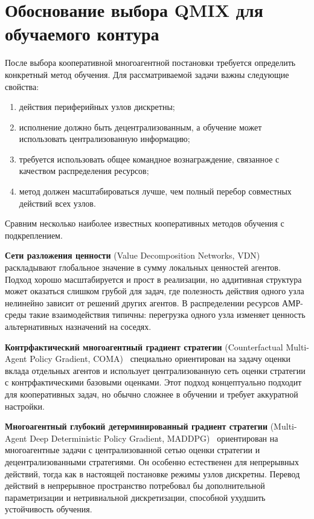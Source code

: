 \section{Обоснование выбора QMIX для обучаемого контура}

После выбора кооперативной многоагентной постановки требуется определить
конкретный метод обучения. Для рассматриваемой задачи важны следующие
свойства:
\begin{enumerate}
	\item действия периферийных узлов дискретны;
	\item исполнение должно быть децентрализованным, а обучение может использовать централизованную информацию;
	\item требуется использовать общее командное вознаграждение, связанное с
	качеством распределения ресурсов;
	\item метод должен масштабироваться лучше, чем полный перебор совместных
	действий всех узлов.
\end{enumerate}

Сравним несколько наиболее известных кооперативных методов обучения с подкреплением.

\textbf{Сети разложения ценности} (Value Decomposition Networks, VDN)~\cite{Sunehag2017VDN} раскладывают глобальное значение в сумму локальных ценностей агентов. Подход хорошо масштабируется и прост в реализации, но аддитивная структура может оказаться слишком грубой для задач, где полезность действия одного узла нелинейно зависит от решений других агентов. В распределении ресурсов АМР-среды такие взаимодействия типичны: перегрузка одного узла изменяет ценность альтернативных назначений на соседях.

\textbf{Контрфактический многоагентный градиент стратегии} (Counterfactual Multi-Agent Policy Gradient, COMA)~\cite{Foerster2017COMA} специально ориентирован на задачу оценки вклада отдельных агентов и использует централизованную сеть оценки стратегии с контрфактическими базовыми оценками. Этот подход концептуально подходит для кооперативных задач, но обычно сложнее в обучении и требует аккуратной настройки.

\textbf{Многоагентный глубокий детерминированный градиент стратегии} (Multi-Agent Deep Deterministic Policy Gradient, MADDPG)~\cite{Lowe2017MADDPG} ориентирован на многоагентные задачи с централизованной сетью оценки стратегии и
децентрализованными стратегиями. Он особенно естественен для непрерывных действий, тогда как в настоящей постановке режимы узлов дискретны. Перевод действий в непрерывное пространство потребовал бы дополнительной параметризации и нетривиальной дискретизации, способной ухудшить устойчивость обучения.

